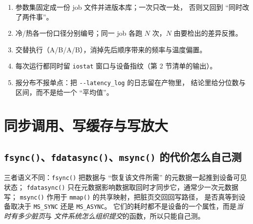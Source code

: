 \documentclass[12pt,a4paper,fontset=fandol]{ctexbook}
\newcommand{\Fn}[1]{\texttt{#1()}}
\newcommand{\Tp}[1]{\texttt{#1}}
\newcommand{\Opt}[1]{\texttt{-\/-#1}}
\begin{document}
\begin{bestpractice}[title={A/B 对照的正确跑法}]
\begin{enumerate}
\item 参数集固定成一份 job 文件并进版本库；一次只改一处，
  否则又回到 ``同时改了两件事''。
\item 冷/热各一份口径分别编号；同一 job 各跑 $N$ 次，$N$ 由要检出的差异反推。
\item 交替执行（A/B/A/B），消掉先后顺序带来的频率与温度偏置。
\item 每次运行都同时留 \Tp{iostat} 窗口与设备指纹（第 2 节清单的输出）。
\item 报分布不报单点：把 \Opt{latency\_log} 的日志留在产物里，
  结论里给分位数与区间，而不是给一个 ``平均值''。
\end{enumerate}
\end{bestpractice}

\section{同步调用、写缓存与写放大}
\label{sec:pm08-sync}

\subsection{\Fn{fsync}、\Fn{fdatasync}、\Fn{msync} 的代价怎么自己测}
\label{sub:pm08-fsync}

三者语义不同：\Fn{fsync} 把数据与 ``恢复该文件所需'' 的元数据一起推到设备可见状态；
\Fn{fdatasync} 只在元数据影响数据取回时才同步它，通常少一次元数据写；
\Fn{msync} 作用于 \Fn{mmap} 的共享映射，把脏页交回回写路径，
是否真等到设备取决于 \Tp{MS\_SYNC} 还是 \Tp{MS\_ASYNC}。
它们的耗时都不是设备的一个属性，而是\emph{当时有多少脏页}与
\emph{文件系统怎么组织提交}的函数，所以只能自己测。
\end{document}
